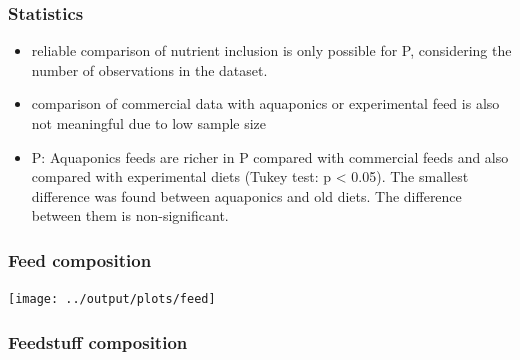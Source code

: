 \documentclass[
]{article}
\begin{document}
\hypertarget{statistics}{%
\subsubsection{Statistics}\label{statistics}}

\begin{itemize}
\item
  reliable comparison of nutrient inclusion is only possible for P,
  considering the number of observations in the dataset.
\item
  comparison of commercial data with aquaponics or experimental feed is
  also not meaningful due to low sample size
\item
  P: Aquaponics feeds are richer in P compared with commercial feeds and
  also compared with experimental diets (Tukey test: p \textless{}
  0.05). The smallest difference was found between aquaponics and old
  diets. The difference between them is non-significant.
\end{itemize}

\hypertarget{feed-composition}{%
\subsubsection{Feed composition}\label{feed-composition}}

\texttt{[image: ../output/plots/feed]}

\hypertarget{feedstuff-composition}{%
\subsubsection{Feedstuff composition}\label{feedstuff-composition}}
\end{document}
